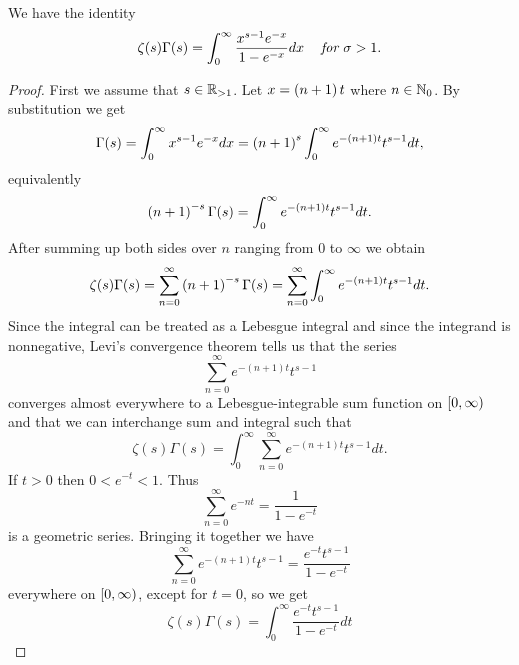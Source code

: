 \begin{theorem}
	We have the identity
\begin{equation}
	\zeta(s)\Gamma(s) = \int _0 ^\infty \frac{x^{s - 1} e^{-x}}{1 - e^{-x}} dx \hspace{0.3cm} \textit{ for } \sigma > 1.
\end{equation}
\end{theorem}
\begin{proof}
	First we assume that $s \in \mathbb{R}_{> 1}$. Let $x = \left(n + 1\right) t$ where $n \in \mathbb{N}_0$. By substitution we get
\begin{equation*}
	\Gamma(s) = \int _0 ^{\infty} x^{s - 1} e^{-x} dx = \left(n + 1\right)^s \int _0 ^\infty e^{-\left(n + 1\right) t} t^{s - 1} dt,
\end{equation*}
equivalently
\begin{equation*}
	\left(n + 1\right)^{-s} \Gamma(s) = \int _0 ^\infty e^{-\left(n + 1\right) t} t^{s - 1} dt.
\end{equation*}
	After summing up both sides over $n$ ranging from $0$ to $\infty$ we obtain
\begin{equation*}
	\zeta(s) \Gamma(s) = \sum _{n = 0} ^\infty \left(n + 1\right)^{-s} \Gamma(s) = \sum _{n = 0} ^\infty \int _0 ^\infty e^{-(n + 1) t} t^{s - 1} dt.
\end{equation*}
	Since the integral can be treated as a Lebesgue integral and since the integrand is nonnegative, Levi’s convergence theorem tells us that the series
\begin{equation*}
	\sum _{n=0} ^\infty e^{-(n + 1) t} t^{s - 1}
\end{equation*}
	converges almost everywhere to a Lebesgue-integrable sum function on $\left[0, \infty\right)$ and that we can interchange sum and integral such that
\begin{equation*}
	\zeta(s) \Gamma(s) = \int _0 ^\infty \sum _{n = 0} ^\infty e^{-(n + 1) t} t^{s - 1} dt.
\end{equation*}
	If $t > 0$ then $0 < e^{-t} < 1$. Thus
\begin{equation*}
	\sum _{n = 0} ^\infty e^{-n t} = \frac{1}{1 - e^{-t}}
\end{equation*}
	is a geometric series. Bringing it together we have
\begin{equation*}
	\sum _{n=0} ^\infty e^{-(n + 1) t} t^{s - 1} = \frac{e^{-t} t^{s - 1}}{1 - e^{-t}}
\end{equation*}
	everywhere on $\left[0, \infty\right)$, except for $t = 0$, so we get
\begin{equation*}
	\zeta(s) \Gamma(s) = \int _0 ^\infty \frac{e^{-t} t^{s - 1}}{1 - e^{-t}} dt

\end{equation*}
\end{proof}
